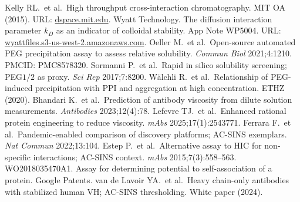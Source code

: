 \begin{thebibliography}{99}
 Kelly RL.\ et al.\ High throughput cross-interaction chromatography. MIT OA (2015). URL: \href{https://dspace.mit.edu/bitstream/handle/1721.1/101373/Wittrup_High\%20throughput.pdf}{dspace.mit.edu}. \cite{Kelly2015,turn1search15}
 Wyatt Technology. The diffusion interaction parameter \(k_D\) as an indicator of colloidal stability. App Note WP5004. URL: \href{https://wyattfiles.s3-us-west-2.amazonaws.com/literature/app-notes/dls-plate/WP5004-diffusion-interaction-parameter-for-colloidal-and-thermal-stability.pdf}{wyattfiles.s3-us-west-2.amazonaws.com}. \cite{Wyatt_kD,turn0search23}
 Oeller M.\ et al.\ Open-source automated PEG precipitation assay to assess relative solubility. \emph{Commun Biol} 2021;4:1210. PMCID: PMC8578320. \cite{Oeller2021,turn11search2}
 Sormanni P.\ et al.\ Rapid in silico solubility screening; PEG\(1/2\) as proxy. \emph{Sci Rep} 2017;7:8200. \cite{Sormanni2017,turn11search14}
 Wälchli R.\ et al.\ Relationship of PEG-induced precipitation with PPI and aggregation at high concentration. ETHZ (2020). \cite{Walchli2020,turn11search12}
 Bhandari K.\ et al.\ Prediction of antibody viscosity from dilute solution measurements. \emph{Antibodies} 2023;12(4):78. \cite{Bhandari2023,turn1search10}
 Lefevre TJ.\ et al.\ Enhanced rational protein engineering to reduce viscosity. \emph{mAbs} 2025;17(1):2543771. \cite{Lefevre2025,turn8search6}
 Ferrara F.\ et al.\ Pandemic-enabled comparison of discovery platforms; AC-SINS exemplars. \emph{Nat Commun} 2022;13:104. \cite{Ferrara2022,turn8search15}
 Estep P.\ et al.\ Alternative assay to HIC for non-specific interactions; AC-SINS context. \emph{mAbs} 2015;7(3):558–563. \cite{Estep2015,turn10search13}
 WO2018035470A1. Assay for determining potential to self-association of a protein. Google Patents. \cite{WO2018035470,turn10search7}
 van de Lavoir YA.\ et al.\ Heavy chain-only antibodies with stabilized human VH; AC-SINS thresholding. White paper (2024). \cite{VanDeLavoir2024,turn9search19}
\end{thebibliography}
